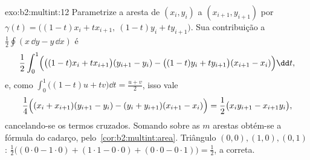 \begin{solution}{exo:b2:multint:12}
Parametrize a aresta de $(x_i, y_i)$ a $(x_{i+1}, y_{i+1})$
por $\gamma(t) = \bigl((1-t)x_i + tx_{i+1},\ (1-t)y_i +
ty_{i+1}\bigr)$. Sua contribuição a
$\frac12\oint(x\,\dd y - y\,\dd x)$ é
\[
\frac12\int_0^1\Bigl(\bigl((1-t)x_i +
tx_{i+1}\bigr)(y_{i+1} - y_i) - \bigl((1-t)y_i +
ty_{i+1}\bigr)(x_{i+1} - x_i)\Bigr)\dd t ,
\]
e, como $\int_0^1\bigl((1-t)u + tv\bigr)\dd t = \frac{u +
v}2$, isso vale
\[
\frac14\Bigl((x_i + x_{i+1})(y_{i+1} - y_i) - (y_i +
y_{i+1})(x_{i+1} - x_i)\Bigr)
= \frac12\bigl(x_iy_{i+1} - x_{i+1}y_i\bigr),
\]
cancelando-se os termos cruzados. Somando sobre as $m$ arestas obtém-se
a fórmula do cadarço, pelo~\cref{cor:b2:multint:area}. Triângulo
$(0,0), (1,0), (0,1)$: $\frac12\bigl((0\cdot0 - 1\cdot0) +
(1\cdot1 - 0\cdot0) + (0\cdot0 - 0\cdot1)\bigr) = \frac12$,
a  correta.
\end{solution}

